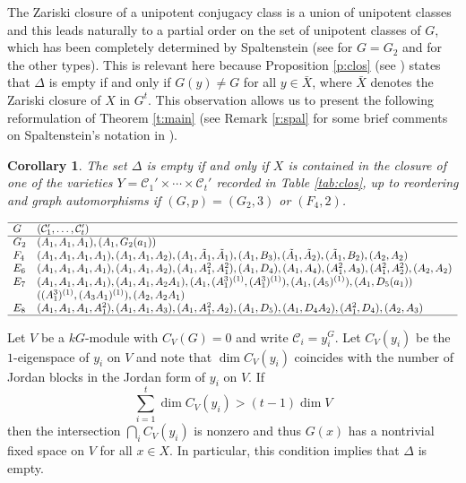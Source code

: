 \documentclass[twoside,a4paper,reqno,11pt]{amsart}
\newcommand{\<}{\langle}
\renewcommand{\>}{\rangle}
\renewcommand{\:}{\colon}
\theoremstyle{plain}
\newtheorem{corol}[theorem]{Corollary}
\theoremstyle{definition}
\begin{document}
The Zariski closure of a unipotent conjugacy class is a union of unipotent classes and this leads naturally to a partial order on the set of unipotent classes of $G$, which has been completely determined by Spaltenstein (see \cite[Section II.10]{Spal} for $G = G_2$ and \cite[Section IV.2]{Spal} for the other types). This is relevant here because Proposition \ref{p:clos} (see \cite[Lemma 2.2]{BGG2}) states that $\Delta$ is empty if and only if $G(y) \ne G$ for all $y \in \bar{X}$, where $\bar{X}$ denotes the Zariski closure of $X$ in $G^t$. This observation allows us to present the following reformulation of Theorem \ref{t:main} (see Remark \ref{r:spal} for some brief comments on Spaltenstein's notation in \cite{Spal}).

\begin{corol}\label{c:main2}
The set $\Delta$ is empty if and only if $X$ is contained in the closure of one of the varieties $Y = \mathcal{C}_1' \times \cdots \times \mathcal{C}_t'$ recorded in Table \ref{tab:clos}, up to reordering and graph automorphisms if $(G,p) = (G_2,3)$ or $(F_4,2)$.
\end{corol}

{\small
\begin{table}
\[
\begin{array}{ll} \hline
G & (\mathcal{C}_1', \ldots, \mathcal{C}_t') \\ \hline
G_2 & (A_1,A_1,A_1), (A_1,G_2(a_1)) \\
F_4 & (A_1,A_1,A_1,A_1), (A_1,A_1,A_2), (A_1,\tilde{A}_1,\tilde{A}_1), (A_1,B_3), (\tilde{A}_1,\tilde{A}_2), (\tilde{A}_1, B_2), (A_2,A_2) \\
E_6 & (A_1,A_1,A_1,A_1), (A_1,A_1,A_2), (A_1,A_1^2,A_1^2), (A_1,D_4), (A_1,A_4), (A_1^2,A_3), (A_1^2,A_2^2), (A_2,A_2) \\
E_7 & (A_1,A_1,A_1,A_1), (A_1,A_1,A_2A_1), (A_1,(A_1^3)^{(1)},(A_1^3)^{(1)}),  (A_1,(A_5)^{(1)}), (A_1,D_5(a_1)) \\
&  ((A_1^3)^{(1)},(A_3A_1)^{(1)}), (A_2,A_2A_1) \\
E_8 & (A_1,A_1,A_1,A_1^2), (A_1,A_1,A_3), (A_1,A_1^2,A_2),  (A_1,D_5), (A_1,D_4A_2), (A_1^2,D_4), (A_2,A_3) \\
\hline
\end{array}
\]
\caption{The varieties $Y = \mathcal{C}_1' \times \cdots \times \mathcal{C}_t'$ in Corollary \ref{c:main2}}
\label{tab:clos}
\end{table}
}

Let $V$ be a $kG$-module with $C_V(G) = 0$ and write $\mathcal{C}_i = y_i^G$. Let $C_V(y_i)$ be the $1$-eigenspace of $y_i$ on $V$ and note that $\dim C_V(y_i)$ coincides with the number of Jordan blocks in the Jordan form of $y_i$ on $V$. If   
\begin{equation}\label{e:di}
\sum_{i=1}^t \dim C_V(y_i) > (t-1)\dim V
\end{equation}
then the intersection $\bigcap_i C_V(y_i)$ is nonzero and thus $G(x)$ has a nontrivial fixed space on $V$ for all $x \in X$. In particular, this condition implies that $\Delta$ is empty. 
\end{document}
